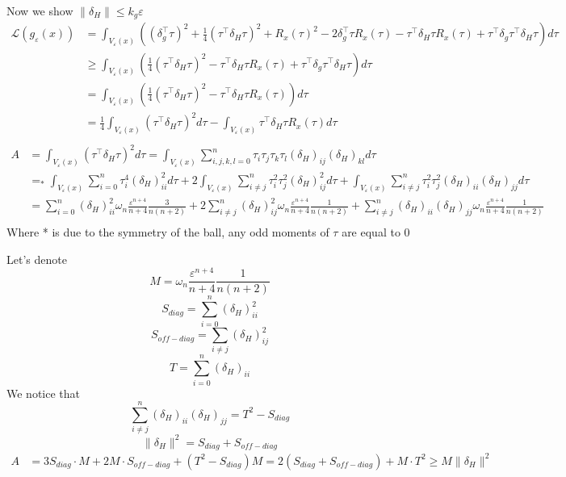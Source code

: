 Now we show \(\|\delta_H\| \leq k_g\varepsilon\)
\begin{align*}
    \mathcal{L}(g_{\varepsilon}(x)) & = \int_{V_{\varepsilon}(x)}((\delta_g^\top\tau)^2 + \tfrac{1}{4}(\tau^\top\delta_H\tau)^2 + R_x(\tau)^2 - 2\delta_g^\top\tau R_x(\tau) - \tau^\top\delta_H\tau  R_x(\tau) + \tau^\top\delta_g\tau^\top\delta_H\tau)d\tau\\
    & \geq \int_{V_{\varepsilon}(x)}(\tfrac{1}{4}(\tau^\top\delta_H\tau)^2 - \tau^\top\delta_H\tau  R_x(\tau) + \tau^\top\delta_g\tau^\top\delta_H\tau)d\tau\\
    & = \int_{V_{\varepsilon}(x)}(\tfrac{1}{4}(\tau^\top\delta_H\tau)^2 - 
    \tau^\top\delta_H\tau  R_x(\tau))d\tau\\
    & = \tfrac{1}{4}\int_{V_{\varepsilon}(x)}(\tau^\top\delta_H\tau)^2d\tau - \int_{V_{\varepsilon}(x)}\tau^\top\delta_H\tau  R_x(\tau)d\tau\\
\end{align*}
\begin{align*}
    A &= \int_{V_{\varepsilon}(x)}(\tau^\top\delta_H\tau)^2 d\tau=  \int_{V_{\varepsilon}(x)} \sum_{i,j,k,l=0}^n \tau_i \tau_j \tau_k \tau_l (\delta_H)_{ij} (\delta_H)_{kl} d\tau \\
    & =_* \int_{V_{\varepsilon}(x)} \sum_{i=0}^n \tau_i^4 (\delta_H)_{ii}^2 d\tau + 2\int_{V_{\varepsilon}(x)} \sum_{i \neq j}^n \tau_i^2 \tau_j^2 (\delta_H)_{ij}^2  d\tau + \int_{V_{\varepsilon}(x)} \sum_{i\neq j}^n \tau_i^2 \tau_j^2 (\delta_H)_{ii} (\delta_H)_{jj} d\tau \\
    & = \sum_{i=0}^n (\delta_H)_{ii}^2 \omega_n \frac{\varepsilon^{n+4}}{n+4}\frac{3}{n(n+2)} + 2\sum_{i \neq j}^n (\delta_H)_{ij}^2  \omega_n \frac{\varepsilon^{n+4}}{n+4}\frac{1}{n(n+2)} + \sum_{i\neq j}^n (\delta_H)_{ii} (\delta_H)_{jj}  \omega_n \frac{\varepsilon^{n+4}}{n+4}\frac{1}{n(n+2)} \\
\end{align*}
Where * is due to the symmetry of the ball, any odd moments of \(\tau\) are equal to 0

Let's denote
\[
M =  \omega_n \frac{\varepsilon^{n+4}}{n+4}\frac{1}{n(n+2)}
\]
\[
S_{diag} = \sum_{i=0}^n (\delta_H)_{ii}^2
\]
\[
S_{off-diag} = \sum_{i\neq j} (\delta_H)_{ij}^2
\]
\[
T  = \sum_{i = 0}^n (\delta_H)_{ii}
\]
We notice that
\[
\sum_{i\neq j}^n (\delta_H)_{ii} (\delta_H)_{jj}  =T^2 - S_{diag}
\]
\[
\|\delta_H\|^2 = S_{diag} + S_{off-diag}
\]
\begin{align*}
    A &= 3S_{diag} \cdot M + 2 M\cdot S_{off-diag} + (T^2 - S_{diag})M = 2 (S_{diag} + S_{off-diag}) + M \cdot T^2 \geq M \|\delta_H\|^2
\end{align*}

